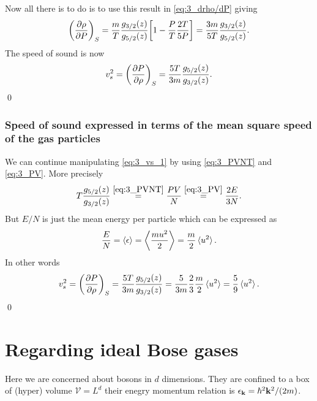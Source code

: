 \documentclass[11pt,letter, swedish, english
]{article}
\begin{document}
Now all there is to do is to use this result in \eqref{eq:3_drho/dP}
giving
\begin{equation}
\qty(\pdv{\rho}{P})_S
=\frac{m}{T}\frac{g_{3/2}(z)}{g_{5/2}(z)}
\qty[1-\frac{P}{T}\frac{2T}{5P}]
=\frac{3m}{5T}\frac{g_{3/2}(z)}{g_{5/2}(z)}.
\end{equation}
The speed of sound is now
\begin{equation}\label{eq:3_vs_1}
v_s^2=\qty(\pdv{P}{\rho})_S
=\frac{5T}{3m}\frac{g_{5/2}(z)}{g_{3/2}(z)}.
\end{equation}
\qed

\subsubsection*{Speed of sound expressed in terms of the mean square
  speed of the gas particles}
We can continue manipulating \eqref{eq:3_vs_1} by using
\eqref{eq:3_PVNT} and \eqref{eq:3_PV}. More precisely
\begin{equation}
T\frac{g_{5/2}(z)}{g_{3/2}(z)}\stackrel{\eqref{eq:3_PVNT}}{=}
\frac{PV}{N}\stackrel{\eqref{eq:3_PV}}{=}
\frac{2E}{3N}.
\end{equation}
But $E/N$ is just the mean energy per particle which can be expressed
as
\begin{equation}
\frac{E}{N}=\ev{\epsilon}=\ev{\frac{mu^2}{2}}
=\frac{m}{2}\ev*{u^2}.
\end{equation}
In other words
\begin{equation}
v_s^2=\qty(\pdv{P}{\rho})_S
=\frac{5T}{3m}\frac{g_{5/2}(z)}{g_{3/2}(z)}
=\frac{5}{3m}\frac{2}{3}\frac{m}{2}\ev*{u^2}
=\frac{5}{9}\ev*{u^2}.
\end{equation}
\qed

\section{Regarding ideal Bose gases }
\newcommand{\V}{\ensuremath{\mathcal{V}}}
\newcommand{\Sd}{\ensuremath{\mathcal{S}_d}}
\newcommand{\D}[1]{\ensuremath{\frac{d}{#1}}}
\newcommand{\nD}[1]{\ensuremath{\nicefrac{d}{#1}}}
\newcommand{\Tc}{\ensuremath{T_{\text{c}}}}

Here we are concerned about bosons in $d$ dimensions. They are
confined to a box of (hyper) volume $\V=L^d$ their enegry momentum
relation is $\epsilon_{\vb{k}}=\hbar^2\vb{k}^2/(2m)$.
\end{document}
